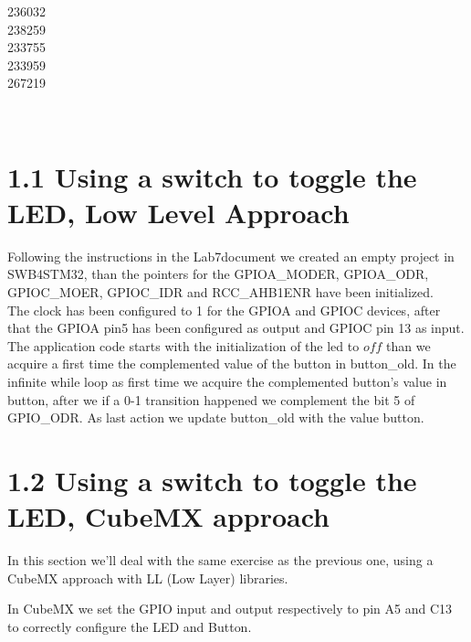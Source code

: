 \documentclass[12pt]{article}
\begin{document}
\begin{titlepage}
\begin{minipage}{0.4\textwidth}
			\begin{flushright} \large
			236032\\													%
			238259\\
            233755\\
            233959\\
            267219\\
            
		\end{flushright}
        
	\end{minipage}\\[2 cm]
	
\end{titlepage}

\newpage




\section*{1.1 Using a switch to toggle the LED, Low Level Approach}
Following the instructions in the Lab7document we created an empty project in SWB4STM32, than the pointers for the GPIOA\_MODER, GPIOA\_ODR, GPIOC\_MOER, GPIOC\_IDR and RCC\_AHB1ENR have been initialized. \\
The clock has been configured to 1 for the GPIOA and GPIOC devices, after that the GPIOA pin5 has been configured as output and GPIOC pin 13 as input.\\
The application code starts with the initialization of the led to $off$ than we acquire a first time the complemented value of the button in button\_old. In the infinite while loop as first time we acquire the complemented button's value in button, after we if a 0-1 transition happened we complement the bit 5 of GPIO\_ODR. As last action we update button\_old with the value button.


\section*{1.2 Using a switch to toggle the LED, CubeMX approach}
In this section we'll deal with the same exercise as the previous one, using a CubeMX approach with LL (Low Layer) libraries. 

In CubeMX we set the GPIO input and output respectively to pin A5 and C13 to correctly configure the LED and Button.
\end{document}
